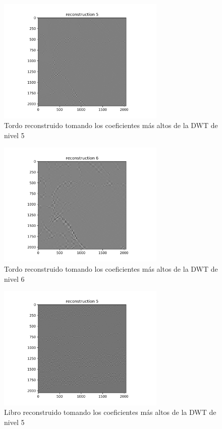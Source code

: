 \documentclass[conference]{IEEEtran}
\begin{document}
\begin{figure}[H]
\includegraphics[width=8cm]{images/tordo_r_h_5.png}
\caption{Tordo reconstruido tomando los coeficientes más altos de la DWT de nivel 5}
\end{figure}

\begin{figure}[H]
\includegraphics[width=8cm]{images/tordo_r_h_6.png}
\caption{Tordo reconstruido tomando los coeficientes más altos de la DWT de nivel 6}
\end{figure}

\begin{figure}[H]
\includegraphics[width=8cm]{images/book_r_h_5.png}
\caption{Libro reconstruido tomando los coeficientes más altos de la DWT de nivel 5}
\end{figure}
\end{document}
